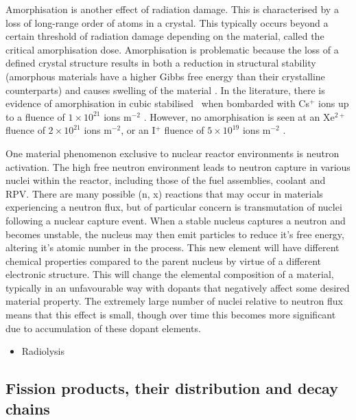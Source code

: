 Amorphisation is another effect of radiation damage. This is characterised by a loss of long-range order of atoms in a crystal. This typically occurs beyond a certain threshold of radiation damage depending on the material, called the critical amorphisation dose. Amorphisation is problematic because the loss of a defined crystal structure results in both a reduction in structural stability (amorphous materials have a higher Gibbs free energy than their crystalline counterparts) and causes swelling of the material \cite{Einfal2013}. In the literature, there is evidence of amorphisation in cubic stabilised \zirconia\ when bombarded with Cs$^{+}$ ions up to a fluence of $1 \times 10^{21}$ ions m$^{-2}$ \cite{amorphization2000wang}. However, no amorphisation is seen at an Xe$^{2+}$ fluence of $2 \times 10^{21}$ ions m$^{-2}$, or an I$^{+}$ fluence of $5 \times 10^{19}$ ions m$^{-2}$ \cite{sickafus1999radiation}.

One material phenomenon exclusive to nuclear reactor environments is neutron activation. The high free neutron environment leads to neutron capture in various nuclei within the reactor, including those of the fuel assemblies, coolant and RPV. There are many possible (n, x) reactions that may occur in materials experiencing a neutron flux, but of particular concern is transmutation of nuclei following a nuclear capture event. When a stable nucleus captures a neutron and becomes unstable, the nucleus may then emit particles to reduce it's free energy, altering it's atomic number in the process. This new element will have different chemical properties compared to the parent nucleus by virtue of a different electronic structure. This will change the elemental composition of a material, typically in an unfavourable way with dopants that negatively affect some desired material property. The extremely large number of nuclei relative to neutron flux means that this effect is small, though over time this becomes more significant due to accumulation of these dopant elements.

\begin{itemize}
\item Radiolysis
\end{itemize}

\subsection{Fission products, their distribution and decay chains}

